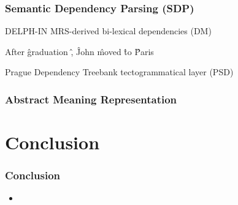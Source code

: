 \documentclass[t]{beamer}
\begin{document}
\begin{frame}
\frametitle{Semantic Dependency Parsing (SDP)}
\centering
\vspace*{\fill}
DELPH-IN MRS-derived bi-lexical dependencies (DM)
\vspace*{\fill}

\begin{dependency}[theme=simple]
	\begin{deptext}[column sep=1.5em,ampersand replacement=\^]
	After \^ graduation \^ , \^ John \^ moved \^ to \^ Paris \\
	\end{deptext}
\end{dependency}

\vspace*{\fill}
Prague Dependency Treebank tectogrammatical layer (PSD)
\end{frame}

\begin{frame}
\frametitle{Abstract Meaning Representation}
\end{frame}


\section[]{Conclusion}

\begin{frame}
\frametitle{Conclusion}
\begin{itemize}
 \item 
\end{itemize}
\end{frame}
\end{document}
